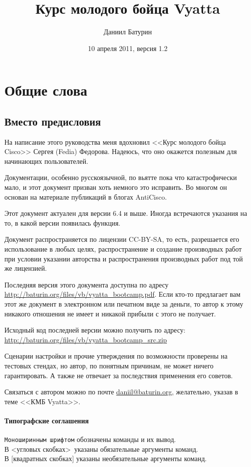 \documentclass[a4paper,12pt, twoside, russian]{report}
\title{Курс молодого бойца Vyatta}
\date{10 апреля 2011, версия 1.2}
\author{Даниил Батурин}
\begin{document}
 \maketitle

\newcommand{\command}[1]{\texttt{#1}}

\tableofcontents
{}

\chapter{Общие слова}

\section{Вместо предисловия}
На написание этого руководства меня вдохновил <<Курс молодого бойца Cisco>> Сергея (Fedia) Федорова. 
Надеюсь, что оно окажется полезным для начинающих пользователей. 

Документации, особенно русскоязычной, по вьятте пока что катастрофически мало, и этот 
документ призван хоть немного это исправить. Во многом он основан на материале публикаций в блогах AntiCisco.

Этот документ актуален для версии 6.4 и выше. Иногда встречаются указания на то, в какой версии появилась
функция.

Документ распространяется по лицензии CC-BY-SA, то есть, разрешается его использование в любых целях,
распространение и создание производных работ  при условии указании авторства и распространения производных 
работ под той же лицензией.

Последняя версия этого документа доступна по адресу \url{http://baturin.org/files/vb/vyatta_bootcamp.pdf}.
Если кто-то предлагает вам этот же документ в электронном или печатном виде за деньги, то автор к этому
никакого отношения не имеет и никакой прибыли с этого не получает.

Исходный код последней версии можно получить по адресу: \url{http://baturin.org/files/vb/vyatta_bootcamp_src.zip}

Сценарии настройки и прочие утверждения по возможности проверены на тестовых стендах, но автор, по понятным
причинам, не может ничего гарантировать. А также не отвечает за последствия применения его советов.

Связаться с автором можно по почте \href{mailto:daniil@baturin.org}{daniil@baturin.org}, желательно, указав в теме
<<КМБ Vyatta>>.

\subsubsection{Типографские соглашения}
\command{Моноширинным шрифтом} обозначены команды и их вывод. \\
В \textless угловых скобках\textgreater\ указаны обязательные аргументы команд. \\
В [квадратных скобках] указаны необязательные аргументы команд.
\end{document}
